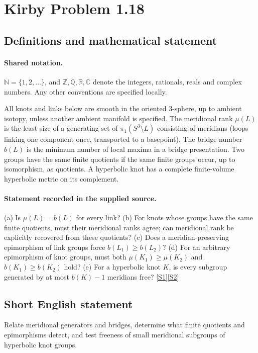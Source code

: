\documentclass[11pt]{article}
\newcommand{\sref}[2]{\hyperlink{source:#1:#2}{[S#2]}}
\begin{document}
\section{Kirby Problem 1.18}\label{statement}

\subsection{Definitions and mathematical statement}

\paragraph{Shared notation.}$\mathbb N=\{1,2,\ldots\}$, and $\mathbb Z,\mathbb Q,\mathbb R,\mathbb C$ denote the integers, rationals, reals and complex numbers. Any other conventions are specified locally.


All knots and links below are smooth in the oriented $3$-sphere, up to ambient isotopy, unless another ambient manifold is specified. The meridional rank $\mu(L)$ is the least size of a generating set of $\pi_1(S^3\setminus L)$ consisting of meridians (loops linking one component once, transported to a basepoint). The bridge number $b(L)$ is the minimum number of local maxima in a bridge presentation. Two groups have the same finite quotients if the same finite groups occur, up to isomorphism, as quotients. A hyperbolic knot has a complete finite-volume hyperbolic metric on its complement.
\paragraph{Statement recorded in the supplied source.}
(a) Is $\mu(L)=b(L)$ for every link? (b) For knots whose groups have the same finite quotients, must their meridional ranks agree; can meridional rank be explicitly recovered from these quotients? (c) Does a meridian-preserving epimorphism of link groups force $b(L_1)\geq b(L_2)$? (d) For an arbitrary epimorphism of knot groups, must both $\mu(K_1)\geq\mu(K_2)$ and $b(K_1)\geq b(K_2)$ hold? (e) For a hyperbolic knot $K$, is every subgroup generated by at most $b(K)-1$ meridians free? \sref{statement}{1}\sref{statement}{2}
\subsection{Short English statement}
Relate meridional generators and bridges, determine what finite quotients and epimorphisms detect, and test freeness of small meridional subgroups of hyperbolic knot groups.
\end{document}
